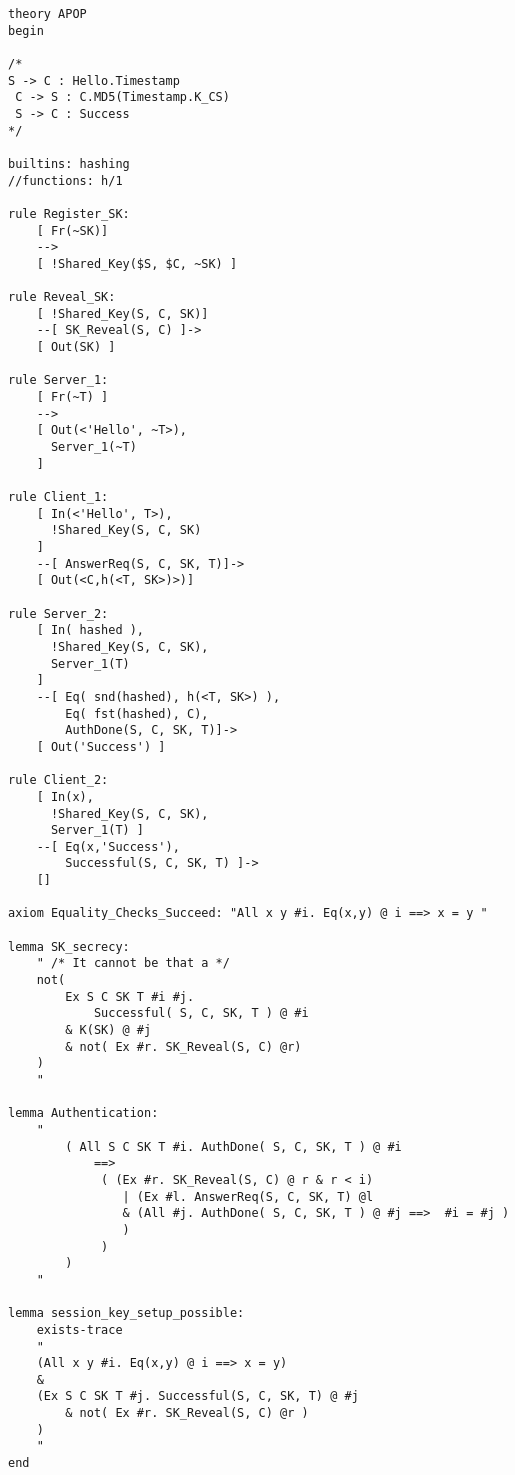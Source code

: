 \documentclass[a4paper, 12pt, titlepage]{article}
\begin{document}
\begin{lstlisting}[caption = Implementation of APOP \cite{github3}]
theory APOP
begin

/*
S -> C : Hello.Timestamp
 C -> S : C.MD5(Timestamp.K_CS)
 S -> C : Success
*/

builtins: hashing
//functions: h/1

rule Register_SK:
	[ Fr(~SK)]
	-->
	[ !Shared_Key($S, $C, ~SK) ]

rule Reveal_SK:
	[ !Shared_Key(S, C, SK)]
	--[ SK_Reveal(S, C) ]->
	[ Out(SK) ]

rule Server_1:
	[ Fr(~T) ]
	-->
	[ Out(<'Hello', ~T>),
	  Server_1(~T)
	]

rule Client_1:
	[ In(<'Hello', T>),
	  !Shared_Key(S, C, SK)
	]
	--[ AnswerReq(S, C, SK, T)]->
	[ Out(<C,h(<T, SK>)>)]

rule Server_2:
	[ In( hashed ),
	  !Shared_Key(S, C, SK),
	  Server_1(T)
	]
	--[ Eq( snd(hashed), h(<T, SK>) ),
		Eq( fst(hashed), C),
		AuthDone(S, C, SK, T)]->
	[ Out('Success') ]

rule Client_2:
	[ In(x),
	  !Shared_Key(S, C, SK),
	  Server_1(T) ]
	--[ Eq(x,'Success'),
		Successful(S, C, SK, T) ]->
	[]

axiom Equality_Checks_Succeed: "All x y #i. Eq(x,y) @ i ==> x = y "

lemma SK_secrecy:
	" /* It cannot be that a */
	not(
		Ex S C SK T #i #j.
			Successful( S, C, SK, T ) @ #i
		& K(SK) @ #j
		& not( Ex #r. SK_Reveal(S, C) @r)
	)
	"

lemma Authentication:
	"
		( All S C SK T #i. AuthDone( S, C, SK, T ) @ #i
			==>
			 ( (Ex #r. SK_Reveal(S, C) @ r & r < i)
				| (Ex #l. AnswerReq(S, C, SK, T) @l
				& (All #j. AuthDone( S, C, SK, T ) @ #j ==>  #i = #j )
				)
			 )
		)
	"

lemma session_key_setup_possible:
	exists-trace
	"
	(All x y #i. Eq(x,y) @ i ==> x = y)
	&
	(Ex S C SK T #j. Successful(S, C, SK, T) @ #j
		& not( Ex #r. SK_Reveal(S, C) @r )
	)
	"
end

\end{lstlisting}
\end{document}
